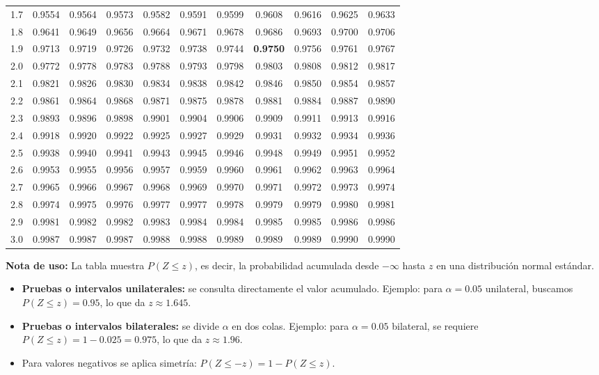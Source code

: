 \begin{center}
\begin{tabular}{c|cccccccccc}
1.7 & 0.9554 & 0.9564 & 0.9573 & 0.9582 & 0.9591 & 0.9599 & 0.9608 & 0.9616 & 0.9625 & 0.9633 \\
1.8 & 0.9641 & 0.9649 & 0.9656 & 0.9664 & 0.9671 & 0.9678 & 0.9686 & 0.9693 & 0.9700 & 0.9706 \\
1.9 & 0.9713 & 0.9719 & 0.9726 & 0.9732 & 0.9738 & 0.9744 & \textbf{0.9750} & 0.9756 & 0.9761 & 0.9767 \\
2.0 & 0.9772 & 0.9778 & 0.9783 & 0.9788 & 0.9793 & 0.9798 & 0.9803 & 0.9808 & 0.9812 & 0.9817 \\
2.1 & 0.9821 & 0.9826 & 0.9830 & 0.9834 & 0.9838 & 0.9842 & 0.9846 & 0.9850 & 0.9854 & 0.9857 \\
2.2 & 0.9861 & 0.9864 & 0.9868 & 0.9871 & 0.9875 & 0.9878 & 0.9881 & 0.9884 & 0.9887 & 0.9890 \\
2.3 & 0.9893 & 0.9896 & 0.9898 & 0.9901 & 0.9904 & 0.9906 & 0.9909 & 0.9911 & 0.9913 & 0.9916 \\
2.4 & 0.9918 & 0.9920 & 0.9922 & 0.9925 & 0.9927 & 0.9929 & 0.9931 & 0.9932 & 0.9934 & 0.9936 \\
2.5 & 0.9938 & 0.9940 & 0.9941 & 0.9943 & 0.9945 & 0.9946 & 0.9948 & 0.9949 & 0.9951 & 0.9952 \\
2.6 & 0.9953 & 0.9955 & 0.9956 & 0.9957 & 0.9959 & 0.9960 & 0.9961 & 0.9962 & 0.9963 & 0.9964 \\
2.7 & 0.9965 & 0.9966 & 0.9967 & 0.9968 & 0.9969 & 0.9970 & 0.9971 & 0.9972 & 0.9973 & 0.9974 \\
2.8 & 0.9974 & 0.9975 & 0.9976 & 0.9977 & 0.9977 & 0.9978 & 0.9979 & 0.9979 & 0.9980 & 0.9981 \\
2.9 & 0.9981 & 0.9982 & 0.9982 & 0.9983 & 0.9984 & 0.9984 & 0.9985 & 0.9985 & 0.9986 & 0.9986 \\
3.0 & 0.9987 & 0.9987 & 0.9987 & 0.9988 & 0.9988 & 0.9989 & 0.9989 & 0.9989 & 0.9990 & 0.9990 \\
\bottomrule
\end{tabular}
\end{center}


\noindent\textbf{Nota de uso:}
La tabla muestra $P(Z \leq z)$, es decir, la probabilidad acumulada desde $-\infty$ hasta $z$ en una distribución normal estándar.

\begin{itemize}
    \item \textbf{Pruebas o intervalos unilaterales:} se consulta directamente el valor acumulado.
    Ejemplo: para $\alpha = 0.05$ unilateral, buscamos $P(Z \leq z) = 0.95$, lo que da $z \approx 1.645$.

    \item \textbf{Pruebas o intervalos bilaterales:} se divide $\alpha$ en dos colas.
    Ejemplo: para $\alpha = 0.05$ bilateral, se requiere $P(Z \leq z) = 1 - 0.025 = 0.975$, lo que da $z \approx 1.96$.

    \item Para valores negativos se aplica simetría:
    $P(Z \leq -z) = 1 - P(Z \leq z)$.
\end{itemize}



